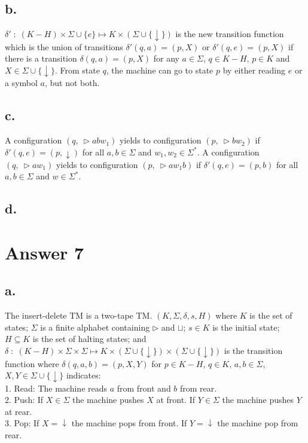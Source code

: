 \documentclass[12pt]{article}
\begin{document}
\subsection*{b.}
$\delta'\;:\;(K-H) \times \Sigma \cup \{e\} \mapsto K\times(\Sigma \cup \{\downarrow\})$ is the new transition function which is the union of transitions $\delta'(q,a) = (p,X)$ or $\delta'(q,e) = (p,X)$ if there is a transition $\delta(q,a)=(p,X)$ for any $a\in \Sigma$, $q\in K-H$, $p\in K$ and $X\in\Sigma \cup \{\downarrow\}$. From state $q$, the machine can go to state $p$ by either reading $e$ or a symbol $a$, but not both.
\subsection*{c.}
A configuration $(q,\ \triangleright a b w_1)$ yields to configuration $(p,\ \triangleright b w_2)$ if $\delta'(q,e) = (p,\downarrow)$ for all $a,b \in \Sigma$ and $w_1,w_2 \in \Sigma^*$. A configuration $(q,\ \triangleright a w_1 )$ yields to configuration $(p,\ \triangleright a w_1 b)$ if $\delta'(q,e) = (p,b)$ for all $a,b \in \Sigma$ and $w \in \Sigma^*$.
\subsection*{d.}

\section*{Answer 7}
\subsection*{a.}
The insert-delete TM is a two-tape TM. $(K, \Sigma, \delta, s, H)$ where $K$ is the set of states; $\Sigma$ is a finite alphabet containing $\triangleright$ and $\sqcup$; $s\in K$ is the initial state; $H\subseteq K$ is the set of halting states; and $\delta\;:\;(K-H) \times \Sigma \times \Sigma \mapsto K\times(\Sigma \cup \{\downarrow\})\times(\Sigma \cup \{\downarrow\})$ is the transition function where $\delta(q,a,b) = (p,X,Y)$ for $p\in K-H$, $q\in K$, $a,b\in\Sigma$, $X,Y\in\Sigma \cup \{\downarrow\}$ indicates: \\
1. Read: The machine reads $a$ from front and $b$ from rear. \\
2. Push: If $X\in \Sigma$ the machine pushes $X$ at front. If $Y\in \Sigma$ the machine pushes $Y$ at rear. \\
3. Pop: If $X=\downarrow$ the machine pops from front. If $Y=\downarrow$ the machine pop from rear. \\
\end{document}
